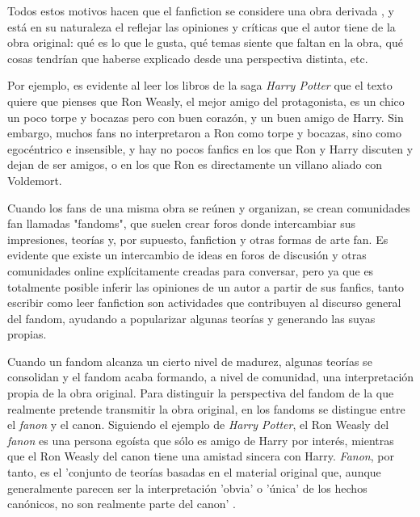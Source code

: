 \documentclass{pre-tfg}
\begin{document}
Todos estos motivos hacen que el fanfiction se considere una obra derivada \cite{woosh_1998}, y está en su naturaleza el reflejar las opiniones y críticas que el autor tiene de la obra original: qué es lo que le gusta, qué temas siente que faltan en la obra, qué cosas tendrían que haberse explicado desde una perspectiva distinta, etc.

Por ejemplo, es evidente al leer los libros de la saga \textit{Harry Potter} que el texto quiere que pienses que Ron Weasly, el mejor amigo del protagonista, es un chico un poco torpe y bocazas pero con buen corazón, y un buen amigo de Harry. Sin embargo, muchos fans no interpretaron a Ron como torpe y bocazas, sino como egocéntrico e insensible, y hay no pocos fanfics en los que Ron y Harry discuten y dejan de ser amigos, o en los que Ron es directamente un villano aliado con Voldemort.

Cuando los fans de una misma obra se reúnen y organizan, se crean comunidades fan llamadas "fandoms", que suelen crear foros donde intercambiar sus impresiones, teorías y, por supuesto, fanfiction y otras formas de arte fan. Es evidente que existe un intercambio de ideas en foros de discusión y otras comunidades online explícitamente creadas para conversar, pero ya que es totalmente posible inferir las opiniones de un autor a partir de sus fanfics, tanto escribir como leer fanfiction son actividades que contribuyen al discurso general del fandom, ayudando a popularizar algunas teorías y generando las suyas propias.

Cuando un fandom alcanza un cierto nivel de madurez, algunas teorías se consolidan y el fandom acaba formando, a nivel de comunidad, una interpretación propia de la obra original. Para distinguir la perspectiva del fandom de la que realmente pretende transmitir la obra original, en los fandoms se distingue entre el \textit{fanon} y el canon. Siguiendo el ejemplo de \textit{Harry Potter}, el Ron Weasly del \textit{fanon} es una persona egoísta que sólo es amigo de Harry por interés, mientras que el Ron Weasly del canon tiene una amistad sincera con Harry. \textit{Fanon}, por tanto, es el 'conjunto de teorías basadas en el material original que, aunque generalmente parecen ser la interpretación 'obvia' o 'única' de los hechos canónicos, no son realmente parte del canon' \cite{uncanny_2017}.


\end{document}
